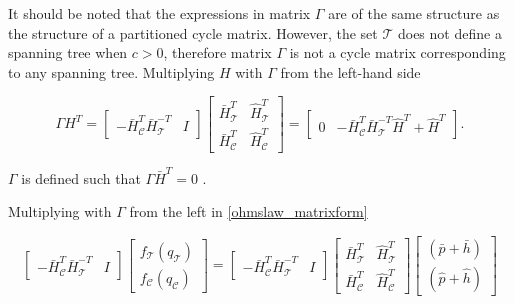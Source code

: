 It should be noted that the expressions in matrix $\Gamma$ are of the same structure as the structure of a partitioned cycle matrix. However, the set $\mathcal{T}$ does not define a spanning tree when $c>0$, therefore matrix $\Gamma$ is not a cycle matrix corresponding to any spanning tree. Multiplying $H$ with $\Gamma$ from the left-hand side

 \begin{equation}
  \label{meshlaw_analogy}
  \Gamma H^T = 
  \begin{bmatrix} 
-\bar{H}^T_{\mathcal{C}}\bar{H}^{-T}_{\mathcal{T}} & I 
\end{bmatrix}
\begin{bmatrix}
   \bar{H}^T_{\mathcal{T}} & \hat{H}^T_{\mathcal{T}} \\[3pt]
   \bar{H}^T_{\mathcal{C}} & \hat{H}^T_{\mathcal{C}} 
   \end{bmatrix} 
   =
   \begin{bmatrix} 
0 & -\bar{H}^T_{\mathcal{C}}\bar{H}^{-T}_{\mathcal{T}}\hat{H}^T + \hat{H}^T 
\end{bmatrix}
.
\end{equation}

$\Gamma$ is defined such that $\Gamma \bar{H}^T = 0$ \cite{deo2017graph}. 

Multiplying with $\Gamma$ from the left in \eqref{ohmslaw_matrixform} 

\begin{equation}
\label{ohmslaw_matrixform_B}
\begin{bmatrix} 
-\bar{H}^T_{\mathcal{C}}\bar{H}^{-T}_{\mathcal{T}} & I 
\end{bmatrix}
 \begin{bmatrix} 
 f_{\mathcal{T}}(q_\mathcal{T}) \\[3pt] 
 f_{\mathcal{C}}(q_\mathcal{C}) 
 \end{bmatrix}
 =
 \begin{bmatrix} 
-\bar{H}^T_{\mathcal{C}}\bar{H}^{-T}_{\mathcal{T}} & I 
\end{bmatrix}
  \begin{bmatrix}
   \bar{H}^T_{\mathcal{T}} & \hat{H}^T_{\mathcal{T}} \\[3pt]
   \bar{H}^T_{\mathcal{C}} & \hat{H}^T_{\mathcal{C}} 
   \end{bmatrix}
   \begin{bmatrix} 
 (\bar{p} + \bar{h}) \\[3pt]
 (\hat{p} + \hat{h}) 
 \end{bmatrix}
\end{equation}

